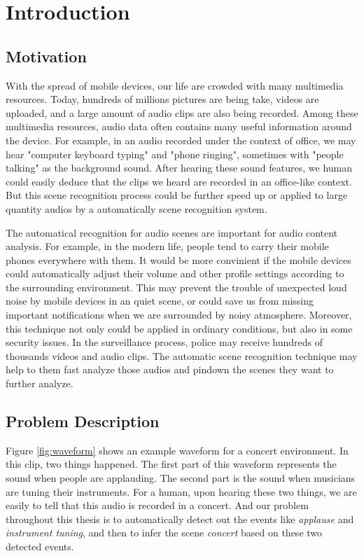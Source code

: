 
\chapter{Introduction}

\section{Motivation}
With the spread of mobile devices, our life are crowded with many multimedia resources. 
Today, hundreds of millions pictures are being take, videos are uploaded, and a large amount of audio clips are also being recorded. 
Among these multimedia resources, audio data often contains many useful information around the device. 
For example, in an audio recorded under the context of office, we may hear "computer keyboard typing" and "phone ringing", sometimes with "people talking" as the background sound. 
After hearing these sound features, we human could easily deduce that the clips we heard are recorded in an office-like context. 
But this scene recognition process could be further speed up or applied to large quantity audios by a automatically scene recognition system.  

The automatical recognition for audio scenes are important for audio content analysis. 
For example, in the modern life, people tend to carry their mobile phones everywhere with them. 
It would be more convinient if the mobile devices could automatically adjust their volume and other profile settings according to the surrounding environment. 
This may prevent the trouble of unexpected loud noise by mobile devices in an quiet scene, or could save us from missing important notifications when we are surrounded by noisy atmosphere.  
Moreover, this technique not only could be applied in ordinary conditions, but also in some security issues. 
In the surveillance process, police may receive hundreds of thousands videos and audio clips. 
The automatic scene recognition technique may help to them fast analyze those audios and pindown the scenes they want to further analyze. 

\section{Problem Description}
Figure \ref{fig:waveform} shows an example waveform for a concert environment. 
In this clip, two things happened. 
The first part of this waveform represents the sound when people are applauding. 
The second part is the sound when musicians are tuning their instruments. 
For a human, upon hearing these two things, we are easily to tell that this audio is recorded in a concert. 
And our problem throughout this thesis is to automatically detect out the events like \textit{applause} and \textit{instrument tuning}, 
and then to infer the scene \textit{concert} based on these two detected events. 


